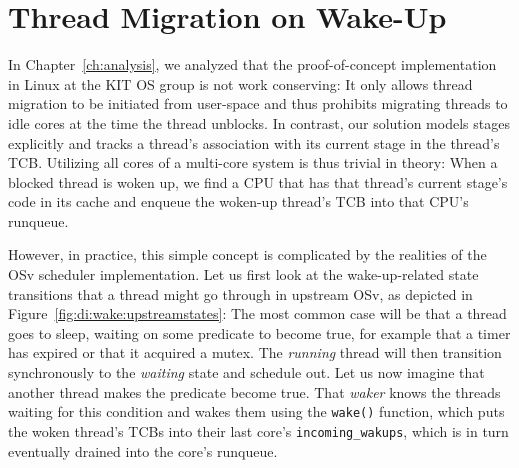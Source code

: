 \documentclass[12pt,a4paper]{book}
\begin{document}
\section{Thread Migration on Wake-Up}\label{ch:di:wake}
In Chapter~\ref{ch:analysis}, we analyzed that the proof-of-concept implementation in Linux at the KIT OS group is not work conserving:
It only allows thread migration to be initiated from user-space and thus prohibits migrating threads to idle cores at the time the thread unblocks.
In contrast, our solution models stages explicitly and tracks a thread's association with its current stage in the thread's TCB.
Utilizing all cores of a multi-core system is thus trivial in theory:
When a blocked thread is woken up, we find a CPU that has that thread's current stage's code in its cache and enqueue the woken-up thread's TCB into that CPU's runqueue.

However, in practice, this simple concept is complicated by the realities of the OSv scheduler implementation.
Let us first look at the wake-up-related state transitions that a thread might go through in upstream OSv, as depicted in Figure~\ref{fig:di:wake:upstreamstates}:
The most common case will be that a thread goes to sleep, waiting on some predicate to become true, for example that a timer has expired or that it acquired a mutex.
The \textit{running} thread will then transition synchronously to the \textit{waiting} state and schedule out.
Let us now imagine that another thread makes the predicate become true.
That \emph{waker} knows the threads waiting for this condition and wakes them using the \lstinline[style=figurecpp]{wake()} function, which puts the woken thread's TCBs into their last core's \lstinline[style=figurecpp]{incoming_wakups}, which is in turn eventually drained into the core's runqueue.
\end{document}
